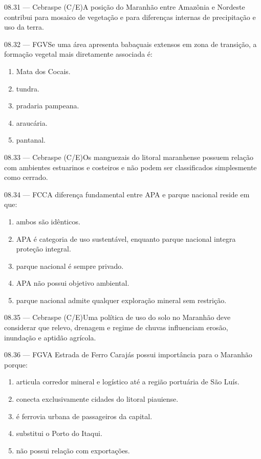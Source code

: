 \begin{questao}{ 08.31 — Cebraspe (C/E)}A posição do Maranhão entre Amazônia e Nordeste contribui para mosaico de vegetação e para diferenças internas de precipitação e uso da terra.\end{questao}
\begin{questao}{ 08.32 — FGV}Se uma área apresenta babaçuais extensos em zona de transição, a formação vegetal mais diretamente associada é:\begin{enumerate}[label=\Alph*)]\item Mata dos Cocais.\item tundra.\item pradaria pampeana.\item araucária.\item pantanal.\end{enumerate}\end{questao}
\begin{questao}{ 08.33 — Cebraspe (C/E)}Os manguezais do litoral maranhense possuem relação com ambientes estuarinos e costeiros e não podem ser classificados simplesmente como cerrado.\end{questao}
\begin{questao}{ 08.34 — FCC}A diferença fundamental entre APA e parque nacional reside em que:\begin{enumerate}[label=\Alph*)]\item ambos são idênticos.\item APA é categoria de uso sustentável, enquanto parque nacional integra proteção integral.\item parque nacional é sempre privado.\item APA não possui objetivo ambiental.\item parque nacional admite qualquer exploração mineral sem restrição.\end{enumerate}\end{questao}
\begin{questao}{ 08.35 — Cebraspe (C/E)}Uma política de uso do solo no Maranhão deve considerar que relevo, drenagem e regime de chuvas influenciam erosão, inundação e aptidão agrícola.\end{questao}
\begin{questao}{ 08.36 — FGV}A Estrada de Ferro Carajás possui importância para o Maranhão porque:\begin{enumerate}[label=\Alph*)]\item articula corredor mineral e logístico até a região portuária de São Luís.\item conecta exclusivamente cidades do litoral piauiense.\item é ferrovia urbana de passageiros da capital.\item substitui o Porto do Itaqui.\item não possui relação com exportações.\end{enumerate}\end{questao}
